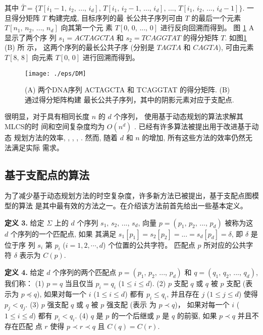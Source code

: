 \documentclass[utf8]{frontiersSCNS} %
\begin{document}
其中
$\bar{T} = \{T[i_1-1,\, i_2,\, ...,\, i_d],\, T[i_1,\, i_2-1,\, ...,\, i_d],\,
...,\, T[i_1,\, i_2,\, ...,\, i_d-1]\}$. 一旦得分矩阵 $T$ 构建完成, 目标序列的最
长公共子序列可由 $T$ 的最后一个元素 $T[n_1,\, n_2,\, ...,\, n_d]$ 向其第一个元
素 $T[0,\, 0,\, ...,\, 0]$ 进行反向回溯而得到。 图 \ref{fig:DM} A 显示了两个序
列 $s_1 = ACTAGCTA$ 和 $s_2 = TCAGGTAT$ 的得分矩阵 $T$. 如图\ref{fig:DM} (B) 所
示， 这两个序列的最长公共子序 (分别是 $TAGTA$ 和 $CAGTA$), 可由元素 $T[8,\, 8]$
向元素 $T[0,\, 0]$ 进行回溯而得到。

\begin{figure}[!h]
  \centering
  \texttt{[image: ./eps/DM]}
  \caption{(A) 两个DNA序列 ACTAGCTA 和 TCAGGTAT 的得分矩阵. (B) 通过得分矩阵构建
    最长公共子序列，其中的阴影元素对应于支配点.}
\label{fig:DM}
\end{figure}

很明显，对于具有相同长度 $n$ 的 $d$ 个序列， 使用基于动态规划的算法求解其MLCS的时
间和空间复杂度均为 $O(n^d)$ \cite{Hsu1984}. 已经有许多算法被提出用于改进基于动态
规划方法的效率, \cite{Hirschberg1977}, \cite{Apostolico1992}, \cite{Masek1980},
\cite{Rick1994}. 然而, 随着 $d$ 和 $n$ 的增加, 所有这些方法的效率仍然无法满足实际
需求。

\subsection{基于支配点的算法}
\label{sec:Dominant Point}

为了减少基于动态规划方法的时空复杂度，许多新方法已被提出，基于支配点图模型的算法
是其中最有效的方法之一。在介绍该方法前首先给出一些基本定义。

\textbf{定义 3.} 给定 $\Sigma$ 上的 $d$ 个序列 $s_1,\, s_2,\, ...,\,
s_d$, 向量 $p = (p_1,\, p_2,\, ...,\, p_d)$ 被称为这 $d$ 个序列的一个匹配点, 如果
其满足 $s_1[p_1] = s_2[p_2] = ... = s_d[p_d] = \delta$, 即 $\delta$ 是位于序
列 $s_i$ 第 $p_i$ ($i=1,2,\cdots,d$) 个位置的公共字符。 匹配点 $p$ 所对应的公共字
符 $\delta$ 表示为 $C(p)$.

\textbf{定义 4.} 给定 $d$ 个序列的两个匹配点 $p = (p_1,\, p_2,\, ...,\,
p_d)$ 和 $q = (q_1,\, q_2,\, ...,\, q_d)$, 我们称： (1) $p = q$ 当且仅当 $p_i =
q_i$ ($1 \leq i \leq d$). (2) $p$ 支配 $q$ 或 $q$ 被 $p$ 支配 (表示为 $p \preceq
q$), 如果对每一个 $i$ ($1 \leq i \leq d$) 都有 $p_i \leq q_i$, 并且存在 $j$
($1 \leq j \leq d$) 使得 $p_j<q_j$. (3) $p$ 强支配 $q$ 或 $q$ 被 $p$ 强支配 (表示
为 $p \prec q$)， 如果对每一个 $i$ ($1 \leq i \leq d$) 都有 $p_i < q_i$. (4) $q$
是 $p$ 的一个后继或 $p$ 是 $q$ 的前驱, 如果 $p \prec q$ 并且不存在匹配
点 $r$ 使得 $p \prec r \prec q$ 且 $C(q) = C(r)$.
\end{document}
